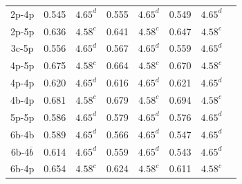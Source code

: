 \documentclass[preprint,12pt]{elsarticle}
\begin{document}
\begin{table}[h!]
\begin{tabular}{c|c|c|c|c|c|c|c}
       2p-4p  &0.545 &$4.65^d$ &0.555 &$4.65^d$ &0.549 &$4.65^d$ \\
       2p-5p  &0.636  &$4.58^c$ &0.641 &$4.58^c$ &0.647 &$4.58^c$ \\
       3c-5p  &0.556  &$4.65^d$ &0.567 &$4.65^d$ &0.559 &$4.65^d$ \\
       4p-5p  &0.675  &$4.58^c$ &0.664 &$4.58^c$ &0.670 &$4.58^c$ \\
       4p-4p &0.620 &$4.65^d$ &0.616 &$4.65^d$ &0.621 &$4.65^d$ \\
       4b-4p  &0.681  &$4.58^c$ &0.679 &$4.58^c$ &0.694 &$4.58^c$ \\
       5p-5p &0.586 &$4.65^d$ &0.579 &$4.65^d$ &0.576 &$4.65^d$ \\
       6b-4b  &0.589  &$4.65^d$ &0.566 &$4.65^d$ &0.547 &$4.65^d$ \\
       6b-4$\overline{b}$  &0.614  &$4.65^d$ &0.559 &$4.65^d$ &0.543 &$4.65^d$ \\
       6b-4p  &0.654  &$4.58^c$ &0.624 &$4.58^c$ &0.611 &$4.58^c$ \\
       \bottomrule
    \end{tabular}
    \label{tab:jumps_vac_oversized}
\end{table}
\end{document}
